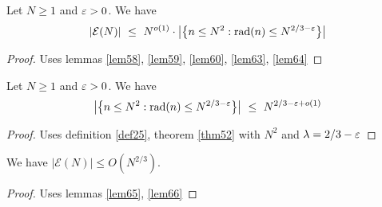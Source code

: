 \begin{lemma} \label{lem65} 
Let $N\ge1$ and $\varepsilon>0$.  We have 
\[
|\mathcal E(N)| \ \le \ N^{o(1)}\cdot\big|\big\{n\le N^2 : \rad(n) \le N^{2/3-\eps}\big\}\big|
\]
\end{lemma}
\begin{proof}\leanok
{}
Uses lemmas \ref{lem58}, \ref{lem59}, \ref{lem60}, \ref{lem63}, \ref{lem64}
\end{proof}

\begin{lemma} \label{lem66} 
Let $N\ge1$ and $\varepsilon>0$. We have 
\[
\big|\big\{n\le N^2 : \operatorname{rad}(n) \le N^{2/3-\varepsilon}\big\}\big| \ \le \ N^{2/3-\varepsilon+o(1)}
\]
\end{lemma}
\begin{proof}\leanok
{}
Uses definition \ref{def25}, theorem \ref{thm52} with $N^2$ and $\lambda=2/3-\varepsilon$
\end{proof}

\begin{theorem}\label{thm:deBr} \label{thm67} 
We have $|\mathcal E(N)| \le O(N^{2/3})$.
\end{theorem}
\begin{proof}\leanok
{}
Uses lemmas \ref{lem65}, \ref{lem66}
\end{proof}
